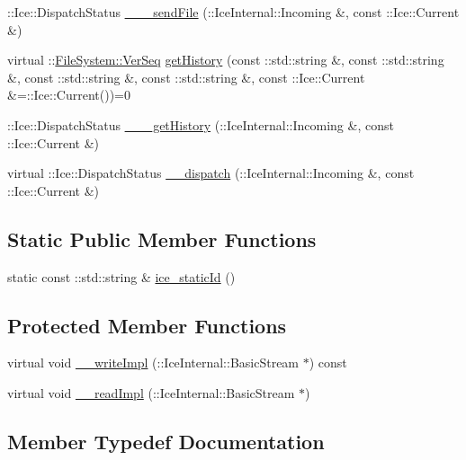 \begin{DoxyCompactItemize}
\item 
\+::Ice\+::\+Dispatch\+Status \hyperlink{class_file_system_1_1_file_a0259134b0777f587ee8b38dd08831a0c}{\+\_\+\+\_\+\+\_\+send\+File} (\+::Ice\+Internal\+::\+Incoming \&, const \+::Ice\+::\+Current \&)
\item 
virtual \+::\hyperlink{namespace_file_system_ac32dc1eb34c060160b52edc7c4e37d6e}{File\+System\+::\+Ver\+Seq} \hyperlink{class_file_system_1_1_file_aa411c511900735474fdba5f9c22a1747}{get\+History} (const \+::std\+::string \&, const \+::std\+::string \&, const \+::std\+::string \&, const \+::std\+::string \&, const \+::Ice\+::\+Current \&=\+::Ice\+::\+Current())=0
\item 
\+::Ice\+::\+Dispatch\+Status \hyperlink{class_file_system_1_1_file_a5798e84a210ecbe73bc52062d9c44019}{\+\_\+\+\_\+\+\_\+get\+History} (\+::Ice\+Internal\+::\+Incoming \&, const \+::Ice\+::\+Current \&)
\item 
virtual \+::Ice\+::\+Dispatch\+Status \hyperlink{class_file_system_1_1_file_a245efe96625966b4d5dc6c70b6f5eae8}{\+\_\+\+\_\+dispatch} (\+::Ice\+Internal\+::\+Incoming \&, const \+::Ice\+::\+Current \&)
\end{DoxyCompactItemize}
\subsection*{Static Public Member Functions}
\begin{DoxyCompactItemize}
\item 
static const \+::std\+::string \& \hyperlink{class_file_system_1_1_file_ad7894f231547d245a095e12fc557dc2c}{ice\+\_\+static\+Id} ()
\end{DoxyCompactItemize}
\subsection*{Protected Member Functions}
\begin{DoxyCompactItemize}
\item 
virtual void \hyperlink{class_file_system_1_1_file_a2ba83e5fbc37577fb08f6cc44b1006e2}{\+\_\+\+\_\+write\+Impl} (\+::Ice\+Internal\+::\+Basic\+Stream $\ast$) const 
\item 
virtual void \hyperlink{class_file_system_1_1_file_af70b25b7133fa3f2be82b8b8ce37b852}{\+\_\+\+\_\+read\+Impl} (\+::Ice\+Internal\+::\+Basic\+Stream $\ast$)
\end{DoxyCompactItemize}


\subsection{Member Typedef Documentation}
\hypertarget{class_file_system_1_1_file_a51b2a288a025efc05fb07e0dfb29f06f}{}
